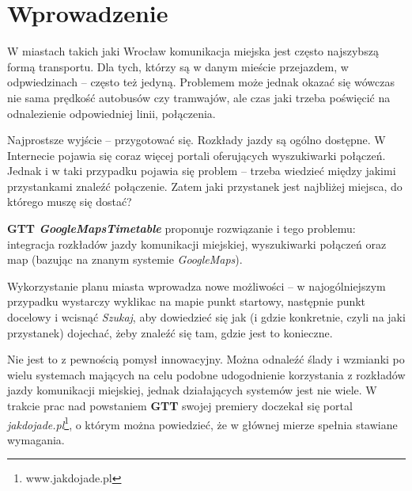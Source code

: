 \documentclass[a4paper,12pt]{article}
\begin{document}
\section*{Wprowadzenie} 


W miastach takich jaki Wrocław komunikacja miejska jest często najszybszą formą
transportu. Dla tych, którzy są w danym mieście przejazdem, w odpwiedzinach --
często też jedyną. Problemem może jednak okazać się wówczas nie sama prędkość
autobusów czy tramwajów, ale czas jaki trzeba poświęcić na odnalezienie odpowiedniej linii, połączenia.

Najprostsze wyjście -- przygotować się. Rozkłady
jazdy są ogólno dostępne. W Internecie pojawia się coraz więcej portali
oferujących wyszukiwarki połączeń. Jednak i w taki przypadku pojawia się
problem -- trzeba wiedzieć między jakimi przystankami znaleźć połączenie. Zatem
jaki przystanek jest najbliżej miejsca, do którego muszę się dostać?

\textbf{GTT \emph{GoogleMapsTimetable}} proponuje rozwiązanie i tego problemu:
integracja rozkładów jazdy komunikacji miejskiej, wyszukiwarki połączeń oraz
map (bazując na znanym systemie \emph{GoogleMaps}).

Wykorzystanie planu miasta wprowadza nowe możliwości -- w najogólniejszym
przypadku wystarczy wyklikac na mapie punkt startowy, następnie punkt docelowy
i wcisnąć \emph{Szukaj}, aby dowiedzieć się jak (i gdzie konkretnie, czyli na
jaki przystanek) dojechać, żeby znaleźć się tam, gdzie jest to konieczne.

Nie jest to z pewnością pomysł innowacyjny. Można odnaleźć ślady i wzmianki
po wielu systemach mających na celu podobne udogodnienie korzystania z
rozkładów jazdy komunikacji miejskiej, jednak działających systemów jest nie
wiele. W trakcie prac nad powstaniem \textbf{GTT} swojej premiery doczekał się
portal \emph{jakdojade.pl}\footnote{www.jakdojade.pl}, o którym można
powiedzieć, że w głównej mierze spełnia stawiane wymagania.
\end{document}
